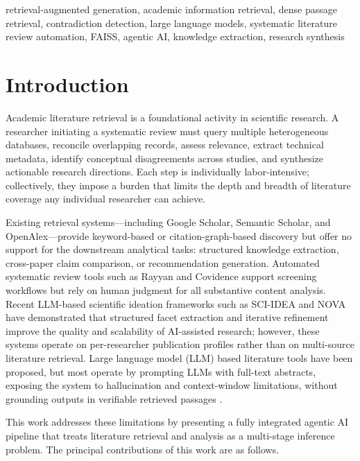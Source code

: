 \documentclass[conference]{IEEEtran}
\begin{document}
\begin{IEEEkeywords}
retrieval-augmented generation, academic information retrieval,
dense passage retrieval, contradiction detection,
large language models, systematic literature review automation,
FAISS, agentic AI, knowledge extraction, research synthesis
\end{IEEEkeywords}

\section{Introduction}

Academic literature retrieval is a foundational activity in scientific
research. A researcher initiating a systematic review must query multiple
heterogeneous databases, reconcile overlapping records, assess relevance,
extract technical metadata, identify conceptual disagreements across studies,
and synthesize actionable research directions. Each step is individually
labor-intensive; collectively, they impose a burden that limits the depth and
breadth of literature coverage any individual researcher can achieve.

Existing retrieval systems---including Google Scholar, Semantic Scholar,
and OpenAlex---provide keyword-based or citation-graph-based discovery but
offer no support for the downstream analytical tasks: structured knowledge
extraction, cross-paper claim comparison, or recommendation generation.
Automated systematic review tools such as Rayyan and Covidence support
screening workflows but rely on human judgment for all substantive content
analysis. Recent LLM-based scientific ideation frameworks such as
SCI-IDEA \cite{b16} and NOVA \cite{b17} have demonstrated that structured
facet extraction and iterative refinement improve the quality and scalability
of AI-assisted research; however, these systems operate on per-researcher
publication profiles rather than on multi-source literature retrieval.
Large language model (LLM) based literature tools have been
proposed, but most operate by prompting LLMs with full-text abstracts,
exposing the system to hallucination and context-window limitations, without
grounding outputs in verifiable retrieved passages \cite{b5}.

This work addresses these limitations by presenting a fully integrated
agentic AI pipeline that treats literature retrieval and analysis as a
multi-stage inference problem. The principal contributions of this work are
as follows.
\end{document}
